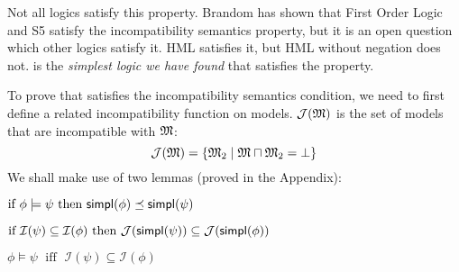Not all logics satisfy this
property.  Brandom has shown that First Order Logic and S5 satisfy the
incompatibility semantics property, but it is an open question which
other logics satisfy it.  HML satisfies it, but HML without negation
does not.  \ELABR{} is the \emph{simplest logic we have found} that
satisfies the property.

To prove that \ELABR{} satisfies the incompatibility semantics condition, we need to first define a related incompatibility function on  models.
$\mathcal{J}(\frak{M})$ is the set of models that are incompatible with $\frak{M}$:
\[
\mathcal{J}(\frak{M}) = \{ \frak{M}_2 \; | \; \frak{M} \sqcap \frak{M}_2 = \bot \}
\]
We shall make use of two lemmas (proved in the Appendix):
\begin{lemma}
\label{inc1}
$\mbox{if }\phi \models \psi \mbox{ then } \mathsf{simpl}(\phi) \preceq \mathsf{simpl}(\psi)$
\end{lemma}
\begin{lemma}
\label{inc3}
$\mbox{if }\mathcal{I}(\psi) \subseteq \mathcal{I}(\phi) \mbox{ then } \mathcal{J}(\mathsf{simpl}(\psi)) \subseteq \mathcal{J}(\mathsf{simpl}(\phi))$
\end{lemma}

\begin{theorem}
\label{incompatibilitytheorem}
$\phi \models \psi \; \mbox{ iff } \; \mathcal{I}(\psi) \subseteq \mathcal{I}(\phi)$
\end{theorem}

